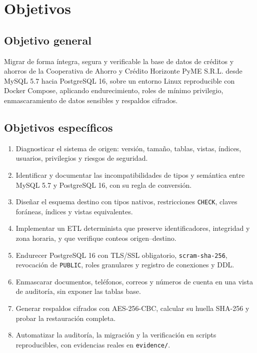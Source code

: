 
\section{Objetivos}

\subsection{Objetivo general}

Migrar de forma íntegra, segura y verificable la base de datos de créditos y
ahorros de la Cooperativa de Ahorro y Crédito Horizonte PyME S.R.L. desde
MySQL 5.7 hacia PostgreSQL 16, sobre un entorno Linux reproducible con Docker
Compose, aplicando endurecimiento, roles de mínimo privilegio, enmascaramiento
de datos sensibles y respaldos cifrados.

\subsection{Objetivos específicos}

\begin{enumerate}
  \item Diagnosticar el sistema de origen: versión, tamaño, tablas, vistas,
        índices, usuarios, privilegios y riesgos de seguridad.
  \item Identificar y documentar las incompatibilidades de tipos y semántica
        entre MySQL 5.7 y PostgreSQL 16, con su regla de conversión.
  \item Diseñar el esquema destino con tipos nativos, restricciones
        \texttt{CHECK}, claves foráneas, índices y vistas equivalentes.
  \item Implementar un ETL determinista que preserve identificadores,
        integridad y zona horaria, y que verifique conteos origen--destino.
  \item Endurecer PostgreSQL 16 con TLS/SSL obligatorio,
        \texttt{scram-sha-256}, revocación de \texttt{PUBLIC}, roles granulares
        y registro de conexiones y DDL.
  \item Enmascarar documentos, teléfonos, correos y números de cuenta en una
        vista de auditoría, sin exponer las tablas base.
  \item Generar respaldos cifrados con AES-256-CBC, calcular su huella
        SHA-256 y probar la restauración completa.
  \item Automatizar la auditoría, la migración y la verificación en scripts
        reproducibles, con evidencias reales en \texttt{evidence/}.
\end{enumerate}

